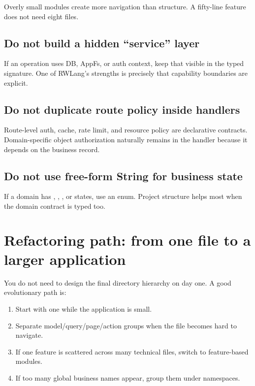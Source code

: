 Overly small modules create more navigation than structure. A fifty-line feature does not need eight files.

\subsection*{Do not build a hidden ``service'' layer}

If an operation uses DB, AppFs, or auth context, keep that visible in the typed signature. One of RWLang's strengths is precisely that capability boundaries are explicit.

\subsection*{Do not duplicate route policy inside handlers}

Route-level auth, cache, rate limit, and resource policy are declarative contracts. Domain-specific object authorization naturally remains in the handler because it depends on the business record.

\subsection*{Do not use free-form String for business state}

If a domain has , , , or  states, use an enum. Project structure helps most when the domain contract is typed too.

\section{Refactoring path: from one file to a larger application}

You do not need to design the final directory hierarchy on day one. A good evolutionary path is:

\begin{enumerate}
  \item Start with one  while the application is small.
  \item Separate model/query/page/action groups when the file becomes hard to navigate.
  \item If one feature is scattered across many technical files, switch to feature-based modules.
  \item If too many global business names appear, group them under  namespaces.
\end{enumerate}
